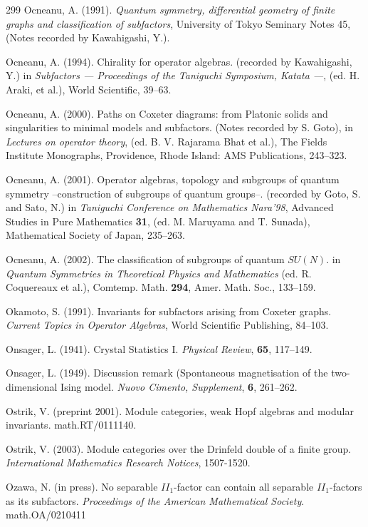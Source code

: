 \documentclass[12pt]{article}
\theoremstyle{plain}
\theoremstyle{definition}
\numberwithin{equation}{section}
\begin{document}
\begin{thebibliography} {299}
Ocneanu, A. (1991). {\em Quantum symmetry, differential geometry of
finite graphs and classification of subfactors},
University of Tokyo Seminary Notes 45, (Notes recorded by Kawahigashi, Y.).

Ocneanu, A. (1994). Chirality for operator algebras. (recorded by Kawahigashi, Y.)
in {\em Subfactors --- Proceedings of the Taniguchi Symposium, Katata ---},
(ed. H. Araki, et al.), World Scientific, 39--63.

Ocneanu, A. (2000).
Paths on Coxeter diagrams: from Platonic solids and singularities
to minimal models and subfactors. (Notes recorded by S. Goto), in
{\em Lectures on operator theory}, (ed. B. V. Rajarama Bhat et al.), The Fields Institute Monographs, Providence, Rhode Island: AMS Publications, 243--323.

Ocneanu, A. (2001). Operator algebras, topology and subgroups of quantum symmetry
--construction of subgroups of quantum groups--. (recorded by Goto, S. and Sato, N.) in {\em Taniguchi Conference on Mathematics Nara'98}, Advanced Studies in Pure Mathematics {\bf 31}, (ed. M. Maruyama and T. Sunada), Mathematical Society of Japan, 235--263.

Ocneanu, A. (2002).
The classification of subgroups of quantum $SU(N)$.
in {\em Quantum Symmetries in Theoretical Physics and
Mathematics} (ed. R. Coquereaux et al.), Comtemp. Math. {\bf 294}, Amer. Math. Soc., 133--159.

Okamoto, S. (1991). Invariants for subfactors arising from Coxeter
graphs. {\em Current Topics in Operator Algebras},
World Scientific Publishing, 84--103.

Onsager, L. (1941). Crystal Statistics I. {\em Physical Review}, {\bf 65}, 117--149.

Onsager, L. (1949). Discussion remark (Spontaneous magnetisation of the
two-dimensional Ising model. {\em Nuovo Cimento, Supplement}, {\bf 6}, 261--262.

Ostrik, V. (preprint 2001). Module categories, weak Hopf algebras and modular invariants.
math.RT/0111140.

Ostrik, V. (2003).
Module categories over the Drinfeld double of a finite group.
{\em International Mathematics Research Notices}, 1507-1520.

Ozawa, N. (in press). No separable $II_1$-factor can contain all separable $II_1$-factors
as its subfactors. {\em Proceedings of the American Mathematical Society}. math.OA/0210411


\end{thebibliography}
\end{document}
